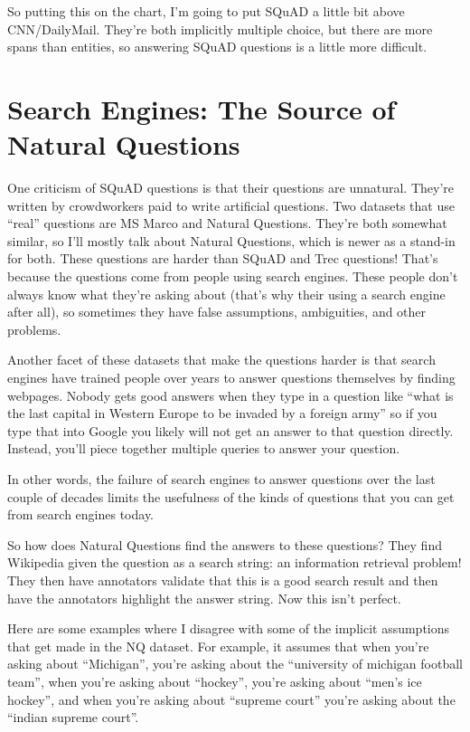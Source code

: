 So putting this on the chart, I’m going to put SQuAD a little bit above CNN/DailyMail.  They’re both implicitly multiple choice, but there are more spans than entities, so answering SQuAD questions is a little more difficult.

\section{Search Engines: The Source of Natural Questions}
\label{sec:datasets:nq}

One criticism of SQuAD questions is that their questions are unnatural.  They’re written by crowdworkers paid to write artificial questions.  Two datasets that use “real” questions are MS Marco and Natural Questions.  They’re both somewhat similar, so I’ll mostly talk about Natural Questions, which is newer as a stand-in for both.  These questions are harder than SQuAD and Trec questions!  That’s because the questions come from people using search engines.  These people don’t always know what they’re asking about (that’s why their using a search engine after all), so sometimes they have false assumptions, ambiguities, and other problems.  

Another facet of these datasets that make the questions harder is that
search engines have trained people over years to answer questions
themselves by finding webpages.  Nobody gets good answers when they
type in a question like “what is the last capital in Western Europe to
be invaded by a foreign army” so if you type that into Google you
likely will not get an answer to that question directly.  Instead,
you’ll piece together multiple queries to answer your question.

In other words, the failure of search engines to answer questions over the last couple of decades limits the usefulness of the kinds of questions that you can get from search engines today.  



So how does Natural Questions find the answers to these questions?  They find Wikipedia given the question as a search string: an information retrieval problem!  They then have annotators validate that this is a good search result and then have the annotators highlight the answer string.  Now this isn’t perfect.  

Here are some examples where I disagree with some of the implicit assumptions that get made in the NQ dataset.  For example, it assumes that when you’re asking about “Michigan”, you’re asking about the “university of michigan football team”, when you’re asking about “hockey”, you’re asking about “men’s ice hockey”, and when you’re asking about “supreme court” you’re asking about the “indian supreme court”.  

